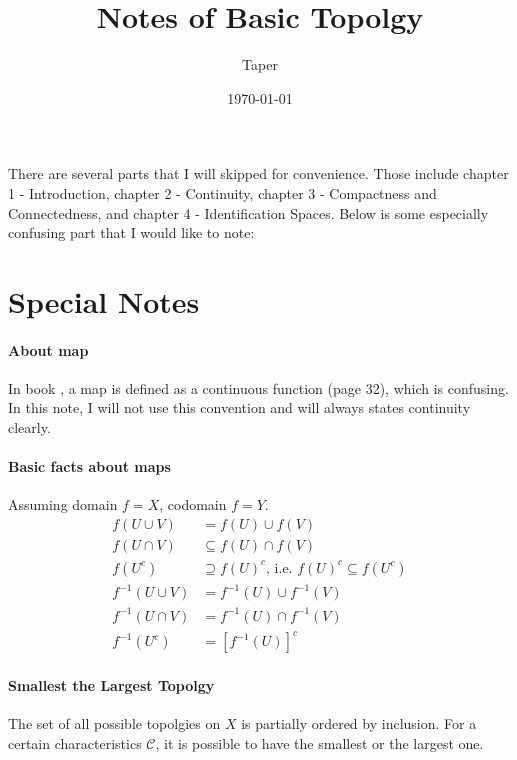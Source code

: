 \documentclass{article}
\title{Notes of Basic Topolgy}
\date{\today}
\author{Taper}
\begin{document}
\maketitle
{}
\tableofcontents
There are several parts that I will skipped for convenience. Those
include chapter 1 - Introduction, chapter 2 - Continuity, chapter 3 -
Compactness and Connectedness, and chapter 4 - Identification Spaces.
Below is some especially confusing part that I would like to note:

\section{Special Notes}
\label{sec:Special-Notes}
\paragraph{About map} In book \cite{book}, a map is defined as a
continuous function (page 32), which is confusing. In this note, I
will not use this convention and will always states continuity
clearly.

\paragraph{Basic facts about maps}
Assuming domain $f=X$, codomain $f=Y$.
\begin{align}
    f(U\cup V) &= f(U)\cup f(V) \\
    f(U\cap V) &\subseteq f(U)\cap f(V) \\
    f(U^c) &\supseteq f(U)^c,\,\text{i.e. } f(U)^c \subseteq f(U^c) \\
    f^{-1}(U\cup V) &= f^{-1}(U)\cup f^{-1}(V) \\
    f^{-1}(U\cap V) &= f^{-1}(U)\cap f^{-1}(V) \\
    f^{-1}(U^c) &= [f^{-1}(U)]^c
\end{align}
\paragraph{Smallest the Largest Topolgy}
The set of all possible topolgies on $X$ is partially ordered by
inclusion. For a certain characteristics $\mathcal{C}$, it is possible
to have the smallest or the largest one. 
\end{document}
